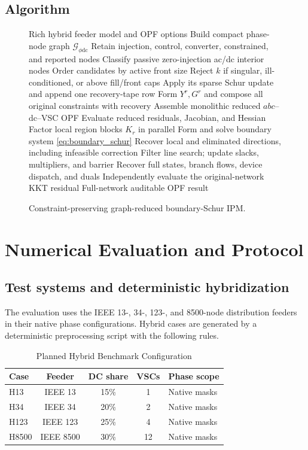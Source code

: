 \documentclass[journal,10pt]{IEEEtran}
\newcommand{\dc}{\mathrm{dc}}
\begin{document}
\subsection{Algorithm}
\begin{figure}[t]
\small
\begin{algorithmic}[1]
\REQUIRE Rich hybrid feeder model and OPF options
\STATE Build compact phase-node graph $\mathcal{G}_{\phi\dc}$
\STATE Retain injection, control, converter, constrained, and reported nodes
\STATE Classify passive zero-injection ac/dc interior nodes
\STATE Order candidates by active front size
  \STATE Reject $k$ if singular, ill-conditioned, or above fill/front caps
  \STATE Apply its sparse Schur update and append one recovery-tape row
\ENDFOR
\STATE Form $Y^r,G^r$ and compose all original constraints with recovery
\STATE Assemble monolithic reduced $abc$--dc--VSC OPF
  \STATE Evaluate reduced residuals, Jacobian, and Hessian
  \STATE Factor local region blocks $K_r$ in parallel
  \STATE Form and solve boundary system \eqref{eq:boundary_schur}
  \STATE Recover local and eliminated directions, including infeasible correction
  \STATE Filter line search; update slacks, multipliers, and barrier
\ENDFOR
\STATE Recover full states, branch flows, device dispatch, and duals
\STATE Independently evaluate the original-network KKT residual
\RETURN Full-network auditable OPF result
\end{algorithmic}
\caption{Constraint-preserving graph-reduced boundary-Schur IPM.}
\label{alg:method}
\end{figure}

\section{Numerical Evaluation and Protocol}
\subsection{Test systems and deterministic hybridization}
The evaluation uses the IEEE 13-, 34-, 123-, and 8500-node distribution
feeders in their native phase configurations.  Hybrid cases are generated by a
deterministic preprocessing script with the following rules.

\begin{table}[b]
\caption{Planned Hybrid Benchmark Configuration}
\label{tab:cases}
\centering
\footnotesize
\setlength{\tabcolsep}{3pt}
\begin{tabularx}{\columnwidth}{lccc>{\raggedright\arraybackslash}X}
\toprule
Case & Feeder & DC share & VSCs & Phase scope\\
\midrule
H13   & IEEE 13   & 15\% & 1  & Native masks\\
H34   & IEEE 34   & 20\% & 2  & Native masks\\
H123  & IEEE 123  & 25\% & 4  & Native masks\\
H8500 & IEEE 8500 & 30\% & 12 & Native masks\\
\bottomrule
\end{tabularx}
\end{table}
\end{document}
